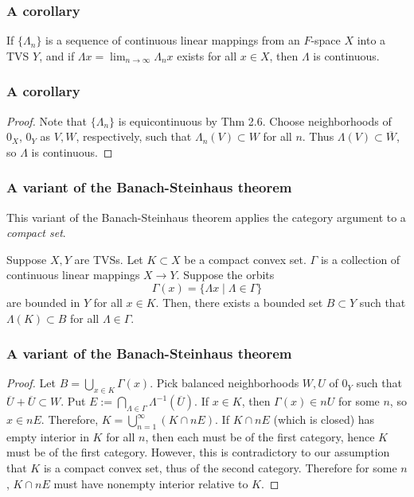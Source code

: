 \documentclass{beamer}
\begin{document}
\begin{frame}
\frametitle{A corollary}
\begin{theorem}
    If $\{\Lambda_n\}$ is a sequence of continuous linear mappings from an $F$-space $X$ into a TVS $Y$, and if $\Lambda x = \lim_{n \to \infty}\Lambda_n x$ exists for all $x \in X$, then $\Lambda$ is continuous.
\end{theorem}
\end{frame}
\begin{frame}
\frametitle{A corollary}
\begin{proof}
    Note that $\{\Lambda_n\}$ is equicontinuous by Thm 2.6. Choose neighborhoods of $0_X$, $0_Y$ as $V, W$, respectively, such that $\Lambda_n(V) \subset W$ for all $n$. Thus $\Lambda(V) \subset \overline{W}$, so $\Lambda$ is continuous.
\end{proof}
\end{frame}
\begin{frame}
\frametitle{A variant of the Banach-Steinhaus theorem}
This variant of the Banach-Steinhaus theorem applies the category argument to a \textit{compact set}.
\begin{theorem}
    Suppose $X,Y$ are TVSs. Let $K \subset X$ be a compact convex set. $\Gamma$ is a collection of continuous linear mappings $X \to Y$. Suppose the orbits \[\Gamma(x) = \{\Lambda x \mid \Lambda \in \Gamma\}\] are bounded in $Y$ for all $x \in K$. Then, there exists a bounded set $B \subset Y$ such that $\Lambda(K) \subset B$ for all $\Lambda \in \Gamma$.
\end{theorem}
\end{frame}
\begin{frame}
\frametitle{A variant of the Banach-Steinhaus theorem}
\begin{proof}\renewcommand{\qedsymbol}{}
    Let $B = \bigcup_{x\in K}\Gamma(x)$. Pick balanced neighborhoods $W, U$ of $0_Y$ such that $\overline{U} + \overline{U} \subset W$. Put $E := \bigcap_{\Lambda \in \Gamma}\Lambda^{-1}(\overline{U})$. If $x \in K$, then $\Gamma(x) \in nU$ for some $n$, so $x \in nE$. Therefore, $K = \bigcup_{n=1}^\infty (K \cap nE)$. If $K \cap nE$ (which is closed) has empty interior in $K$ for all $n$, then each must be of the first category, hence $K$ must be of the first category. However, this is contradictory to our assumption that $K$ is a compact convex set, thus of the second category. Therefore for some $n$, $K\cap nE$ must have nonempty interior relative to $K$.
\end{proof}
\end{frame}
\end{document}
